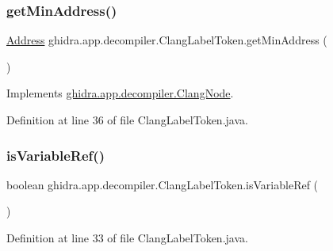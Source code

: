 \subsubsection{\texorpdfstring{getMinAddress()}{getMinAddress()}}
{\footnotesize\ttfamily \mbox{\hyperlink{class_address}{Address}} ghidra.\+app.\+decompiler.\+Clang\+Label\+Token.\+get\+Min\+Address (\begin{DoxyParamCaption}{ }\end{DoxyParamCaption})\hspace{0.3cm}{\ttfamily [inline]}}



Implements \mbox{\hyperlink{interfaceghidra_1_1app_1_1decompiler_1_1_clang_node_a28f86ac40636cd77392e26367db69dc3}{ghidra.\+app.\+decompiler.\+Clang\+Node}}.



Definition at line 36 of file Clang\+Label\+Token.\+java.

\mbox{\label{classghidra_1_1app_1_1decompiler_1_1_clang_label_token_ae73b1f5b02f99f359edec0179c67cd5f}} 
\subsubsection{\texorpdfstring{isVariableRef()}{isVariableRef()}}
{\footnotesize\ttfamily boolean ghidra.\+app.\+decompiler.\+Clang\+Label\+Token.\+is\+Variable\+Ref (\begin{DoxyParamCaption}{ }\end{DoxyParamCaption})\hspace{0.3cm}{\ttfamily [inline]}}



Definition at line 33 of file Clang\+Label\+Token.\+java.

\mbox{\label{classghidra_1_1app_1_1decompiler_1_1_clang_label_token_adb177bbc81757c1491730c834ada7179}} 
